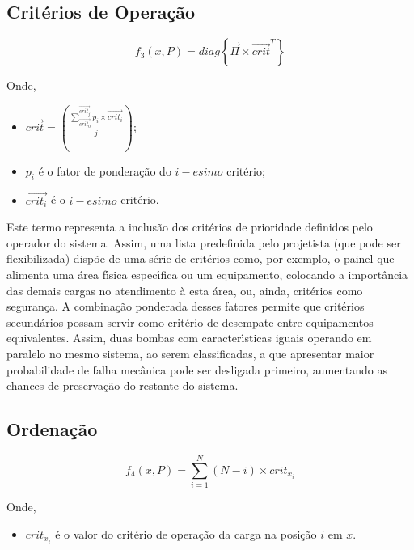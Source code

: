 \subsection{Crit{\'e}rios de Opera{\c c}{\~a}o} \label{subsec:f3}

\begin{equation} \label{eq:f3}
	f_{3} \left( x, P \right) = diag\left\{ \vec{\Pi} \times \vec{crit}^{T} \right\}
\end{equation}

Onde,

\begin{itemize}
	\item[] $ \vec{crit} = \left( \frac{\sum_{\vec{crit_{0}}}^{\vec{crit_{j}}}{p_{i} \times \vec{crit_{i}}}}{j}\right) $;
	\item[] $ p_{i}$ {\'e} o fator de pondera{\c c}{\~a}o do $i-esimo$ crit{\'e}rio;
	\item[] $ \vec{crit_{i}}$ {\'e} o $i-esimo$ crit{\'e}rio.
\end{itemize}

Este termo representa a inclus{\~a}o dos crit{\'e}rios de prioridade definidos pelo operador do sistema. Assim, uma lista predefinida pelo projetista (que pode ser flexibilizada) disp{\~o}e de uma s{\'e}rie de crit{\'e}rios como, por exemplo, o painel que alimenta uma {\'a}rea f{\'\i}sica espec{\'\i}fica ou um equipamento, colocando a import{\^a}ncia das demais cargas no atendimento {\`a} esta {\'a}rea, ou, ainda, crit{\'e}rios como seguran{\c c}a. A combina{\c c}{\~a}o ponderada desses fatores permite que crit{\'e}rios secund{\'a}rios possam servir como crit{\'e}rio de desempate entre equipamentos equivalentes. Assim, duas bombas com caracter{\'\i}sticas iguais operando em paralelo no mesmo sistema, ao serem classificadas, a que apresentar maior probabilidade de falha mec{\^a}nica pode ser desligada primeiro, aumentando as chances de preserva{\c c}{\~a}o do restante do sistema.

\subsection{Ordena{\c c}{\~a}o} \label{subsec:f4}

\begin{equation} \label{eq:f4}
	f_{4} \left( x, P \right) = \sum_{i=1}^{N}{\left(N-i \right) \times crit_{x_{i}}}
\end{equation}

Onde,

\begin{itemize}
    \item $crit_{x_{i}}$ {\'e} o valor do crit{\'e}rio de opera{\c c}{\~a}o da carga na posi{\c c}{\~a}o $i$ em $x$.
\end{itemize}


